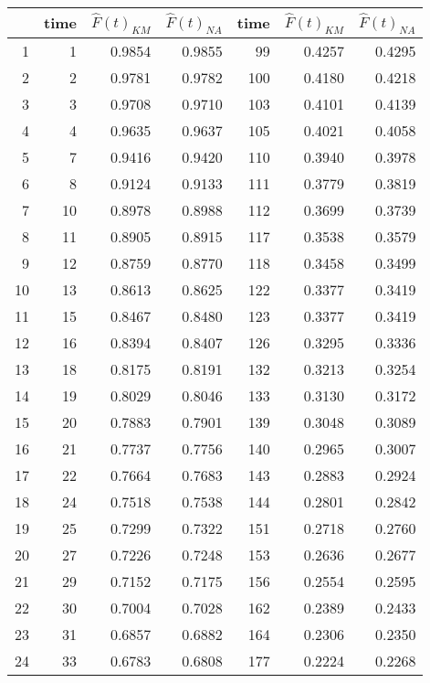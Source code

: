 \documentclass[11pt]{extarticle} %
\begin{document}
\begin{table}[H]
\centering
\begin{tabular}{rrrr||rrr}
  \hline
 & time & $\hat{F}(t)_{KM}$ & $\hat{F}(t)_{NA}$ & time & $\hat{F}(t)_{KM}$ & $\hat{F}(t)_{NA}$ \\ 
  \hline
1 & 1 & 0.9854 & 0.9855 & 99 & 0.4257 & 0.4295 \\ 
  2 & 2 & 0.9781 & 0.9782 & 100 & 0.4180 & 0.4218 \\ 
  3 & 3 & 0.9708 & 0.9710 & 103 & 0.4101 & 0.4139 \\ 
  4 & 4 & 0.9635 & 0.9637 & 105 & 0.4021 & 0.4058 \\ 
  5 & 7 & 0.9416 & 0.9420 & 110 & 0.3940 & 0.3978 \\ 
  6 & 8 & 0.9124 & 0.9133 & 111 & 0.3779 & 0.3819 \\ 
  7 & 10 & 0.8978 & 0.8988 & 112 & 0.3699 & 0.3739 \\ 
  8 & 11 & 0.8905 & 0.8915 & 117 & 0.3538 & 0.3579 \\ 
  9 & 12 & 0.8759 & 0.8770 & 118 & 0.3458 & 0.3499 \\ 
  10 & 13 & 0.8613 & 0.8625 & 122 & 0.3377 & 0.3419 \\ 
  11 & 15 & 0.8467 & 0.8480 & 123 & 0.3377 & 0.3419 \\ 
  12 & 16 & 0.8394 & 0.8407 & 126 & 0.3295 & 0.3336 \\ 
  13 & 18 & 0.8175 & 0.8191 & 132 & 0.3213 & 0.3254 \\ 
  14 & 19 & 0.8029 & 0.8046 & 133 & 0.3130 & 0.3172 \\ 
  15 & 20 & 0.7883 & 0.7901 & 139 & 0.3048 & 0.3089 \\ 
  16 & 21 & 0.7737 & 0.7756 & 140 & 0.2965 & 0.3007 \\ 
  17 & 22 & 0.7664 & 0.7683 & 143 & 0.2883 & 0.2924 \\ 
  18 & 24 & 0.7518 & 0.7538 & 144 & 0.2801 & 0.2842 \\ 
  19 & 25 & 0.7299 & 0.7322 & 151 & 0.2718 & 0.2760 \\ 
  20 & 27 & 0.7226 & 0.7248 & 153 & 0.2636 & 0.2677 \\ 
  21 & 29 & 0.7152 & 0.7175 & 156 & 0.2554 & 0.2595 \\ 
  22 & 30 & 0.7004 & 0.7028 & 162 & 0.2389 & 0.2433 \\ 
  23 & 31 & 0.6857 & 0.6882 & 164 & 0.2306 & 0.2350 \\ 
  24 & 33 & 0.6783 & 0.6808 & 177 & 0.2224 & 0.2268 \\ 

\end{tabular}
\end{table}
\end{document}
